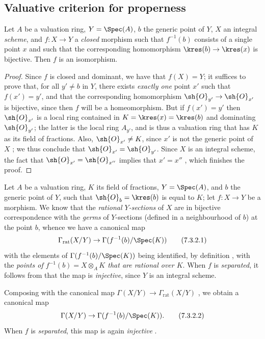 
\subsection{Valuative criterion for properness}
\label{subsection:II.7.3}

\begin{proposition}[7.3.1]
\label{II.7.3.1}
Let $A$ be a valuation ring, $Y=\Spec(A)$, $b$ the generic point of $Y$, $X$ an integral \emph{scheme}, and $f:X\to Y$ a \emph{closed} morphism such that $f^{-1}(b)$ consists of a single point $x$ and such that the corresponding homomorphism $\kres(b)\to\kres(x)$ is bijective.
Then $f$ is an isomorphism.
\end{proposition}

\begin{proof}
Since $f$ is closed and dominant, we have that $f(X)=Y$;
it suffices  to prove that, for all $y'\neq b$ in $Y$, there exists \emph{exactly one} point $x'$ such that $f(x')=y'$, and that the corresponding homomorphism $\sh{O}_{y'}\to\sh{O}_{x'}$ is bijective, since then $f$ will be a homeomorphism.
But if $f(x')=y'$ then $\sh{O}_{x'}$ is a local ring contained in $K=\kres(x)=\kres(b)$ and dominating $\sh{O}_{y'}$;
the latter is the local ring $A_{y'}$, and is thus a valuation ring  that has $K$ as its field of fractions.
Also, $\sh{O}_{x'}\neq K$, since $x'$ is not the generic point of $X$ ;
we thus conclude that $\sh{O}_{x'}=\sh{O}_{y'}$.
Since $X$ is an integral scheme, the fact that $\sh{O}_{x'}=\sh{O}_{x''}$ implies that $x'=x''$ , which finishes the proof.
\end{proof}

\begin{env}[7.3.2]
\label{II.7.3.2}
Let $A$ be a valuation ring, $K$ its field of fractions, $Y=\Spec(A)$, and $b$ the generic point of $Y$, such that $\sh{O}_b=\kres(b)$ is equal to $K$;
let $f:X\to Y$ be a morphism.
We know  that the \emph{rational $Y$-sections} of $X$ are in bijective correspondence with the \emph{germs} of $Y$-sections (defined in a neighbourhood of $b$) at the point $b$, whence we have a canonical map
\[
\label{II.7.3.2.1}
    \Gamma_\mathrm{rat}(X/Y) \to \Gamma(f^{-1}(b)/\Spec(K))
\tag{7.3.2.1}
\]
with the elements of $\Gamma(f^{-1}(b)/\Spec(K))$ being identified, by definition , with the \emph{points of $f^{-1}(b)=X\otimes_A K$ that are rational over $K$}.
When $f$ is \emph{separated}, it follows from  that the map  is \emph{injective}, since $Y$ is an integral scheme.

Composing  with the canonical map $\Gamma(X/Y)\to\Gamma_\mathrm{rat}(X/Y)$ , we obtain a canonical map
\[
\label{II.7.3.2.2}
    \Gamma(X/Y) \to \Gamma(f^{-1}(b)/\Spec(K)).
\tag{7.3.2.2}
\]
When $f$ is \emph{separated}, this map is again \emph{injective} .
\end{env}

